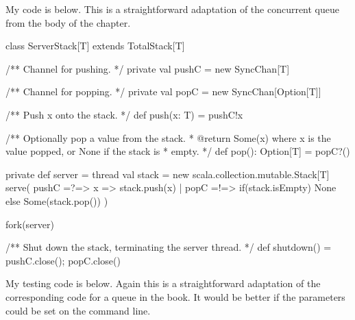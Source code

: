 \begin{answerS}
My code is below.  This is a straightforward adaptation of the concurrent
queue from the body of the chapter.
%
\begin{scala}
class ServerStack[T] extends TotalStack[T]{
  /** Channel for pushing. */
  private val pushC = new SyncChan[T]

  /** Channel for popping. */
  private val popC = new SyncChan[Option[T]]

  /** Push x onto the stack. */
  def push(x: T) = pushC!x

  /** Optionally pop a value from the stack.
    * @return Some(x) where x is the value popped, or None if the stack is
    * empty. */
  def pop(): Option[T] = popC?()

  private def server = thread{
    val stack = new scala.collection.mutable.Stack[T]
    serve(
      pushC =?=> { x => stack.push(x) }
      | popC =!=> { if(stack.isEmpty) None else Some(stack.pop()) }
    )
  }

  fork(server)

  /** Shut down the stack, terminating the server thread. */
  def shutdown() = { pushC.close(); popC.close() }
}
\end{scala}


My testing code is below.  Again this is a straightforward adaptation of the
corresponding code for a queue in the book.   It would be better if the
parameters could be set on the command line.  
%
\end{answerS}
